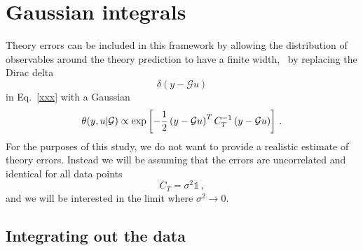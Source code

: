 \section{Gaussian integrals}
\label{sec:GaussianIntegrals}

Theory errors can be included in this framework by allowing the distribution of
observables around the theory prediction to have a finite width, \eg\ by
replacing the Dirac delta 
\begin{equation}
    \label{eq:DiracInApp}
    \delta(y-\mathcal{G}u)
\end{equation}
in Eq.~\ref{xxx} with a Gaussian 
\begin{equation}
    \label{eq:TheoryGaussian}
    \theta(y,u|\mathcal{G}) \propto \exp\left[
        -\frac12 \left(y-\mathcal{G}u\right)^T
        C_T^{-1} \left(y-\mathcal{G}u\right)
    \right]\, .
\end{equation}
For the purposes of this study, we do not want to provide a realistic estimate
of theory errors. Instead we will be assuming that the errors are uncorrelated
and identical for all data points
\begin{equation}
    \label{eq:DiagTheoryCov}
    C_T = \sigma^2 \mathds{1}\, ,
\end{equation}
and we will be interested in the limit where $\sigma^2\to 0$. 

\subsection{Integrating out the data}
\label{sec:IntOutData}

